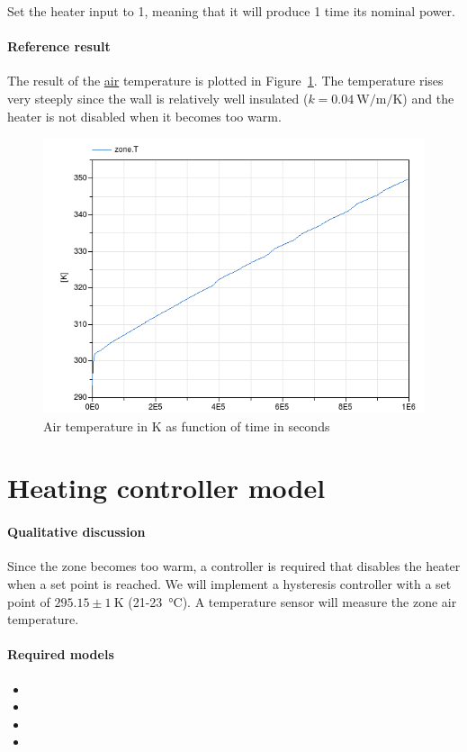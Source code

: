 \documentclass[10pt,a4paper]{article}
\begin{document}
Set the heater input to 1, meaning that it will
produce 1 time its nominal power.


\paragraph{Reference result}
The result of the \underline{air} temperature 
is plotted in Figure~\ref{fig:res4}.
The temperature rises very steeply since the 
wall is relatively well insulated ($k=\SI{0.04}{\watt\per\meter\per\kelvin}$)
and the heater is not disabled when it becomes too warm.



\begin{figure}
\centering
\includegraphics[scale=0.6]{result4.png}
\caption{Air temperature in K as function of time in seconds}
\label{fig:res4}
\end{figure}


\section{Heating controller model}
\paragraph{Qualitative discussion}
Since the zone becomes too warm, a controller
is required that disables the
heater when a set point is reached.
We will implement a hysteresis controller with a set point of $295.15 \pm \SI{1}{\kelvin}$ 
(21-\SI{23}{\celsius}).
A temperature sensor will measure the zone air temperature.


\paragraph{Required models}
\begin{itemize}
\item {}
\item {}
\item {}
\item {}
\end{itemize}
\end{document}
